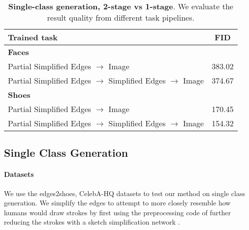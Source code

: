 \begin{table}[t]
	\resizebox{1.\linewidth}{!} {
		\centering
		\begin{tabular}{l c}
			\toprule
			\textbf{Trained task} & \textbf{FID} \\ \midrule
			\textbf{Faces}\\ \hline
			Partial Simplified Edges $\rightarrow$ Image & 383.02 \\
			Partial Simplified Edges $\rightarrow$ Simplified Edges $\rightarrow$ Image & 374.67 \\
			\hline
			\textbf{Shoes}\\ \hline
			Partial Simplified Edges $\rightarrow$ Image & 170.45 \\
			Partial Simplified Edges $\rightarrow$ Simplified Edges $\rightarrow$ Image & 154.32 \\
			\bottomrule %
		\end{tabular}
	}
	\vspace{-2mm}
	\caption{\label{table:2step_eval_single_class} \textbf{Single-class generation, 2-stage vs 1-stage}. We evaluate the result quality from different task pipelines.
		\vspace{-4mm}
	}
\end{table}
\vspace{-2mm}
\subsection{Single Class Generation}
\paragraph{Datasets} We use the edges2shoes\cite{isola2016image2image}, CelebA-HQ\cite{karras2017progressive} datasets to test our method on single class generation. 
We simplify the edges to attempt to more closely resemble how humans would draw strokes by first using the preprocessing code of \cite{li2019im2pencil} further reducing the strokes with a sketch simplification network \cite{simo2016learning}.
